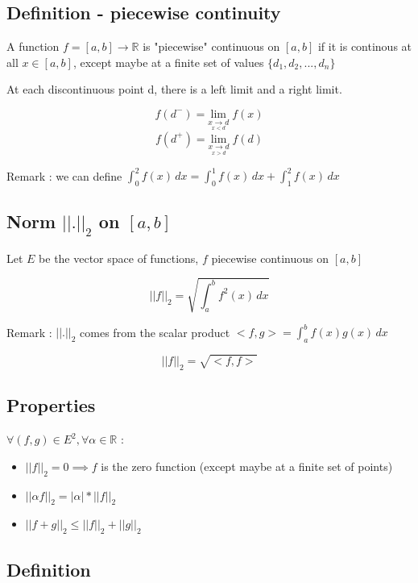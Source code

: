 \documentclass[a4paper,12pt]{article}
\begin{document}
\subsection{Definition - piecewise continuity}

A function $f = [a, b] \rightarrow \mathbb{R} $ is "piecewise" continuous on $[a, b]$ if it is continous at all $x \in [a, b]$, except maybe at a finite set of values $\{d_1, d_2, ..., d_n\}$ \newline

At each discontinuous point d, there is a left limit and a right limit. \newline

\[
f(d^-) = \underset{\underset{x < d}{x \rightarrow d}}{\text{lim}} \; f(x)
\]
\[
f(d^+) = \underset{\underset{x > d}{x \rightarrow d}}{\text{lim}} \; f(d)
\]

Remark : we can define $\int_{0}^{2} f(x)\,dx = \int_{0}^{1} f(x)\,dx + \int_{1}^{2} f(x)\,dx$

\subsection{Norm $||.||_2$ on $[a, b]$}

Let $E$ be the vector space of functions, $f$ piecewise continuous on $[a,b]$

\[
||f||_2 = \sqrt{\int_{a}^{b}f^2(x)\,dx}
\]

Remark :  $||.||_2$  comes from the scalar product $<f, g> = \int_{a}^{b}f(x)g(x)\,dx$ \newline

\[ 
||f||_2 = \sqrt{<f, f>}
\]

\subsection{Properties}

$\forall (f,g) \in E^2, \forall \alpha \in \mathbb{R}$ : \newline

\begin{itemize}
    \item $||f||_2 = 0 \implies f$ is the zero function (except maybe at a finite set of points)
    \item $||\alpha f||_2 = |\alpha| * ||f||_2$
    \item $||f + g||_2 \leq ||f||_2 + ||g||_2$
\end{itemize}

\subsection{Definition}
\end{document}
